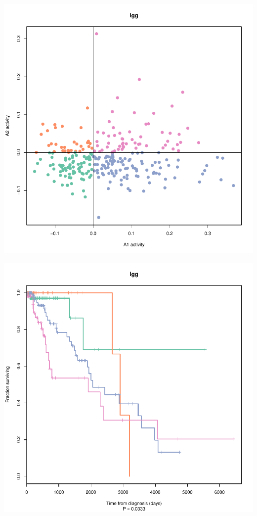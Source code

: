 \documentclass{article}\usepackage[]{graphicx}\usepackage[]{color}
\makeatletter
\def\maxwidth{ %
  \ifdim\Gin@nat@width>\linewidth
    \linewidth
  \else
    \Gin@nat@width
  \fi
}
\newenvironment{knitrout}{}{} %
\makeatother
\begin{document}
\begin{knitrout}
{\centering \includegraphics[width=\maxwidth]{figure/km-curves-11} 

}




{\centering \includegraphics[width=\maxwidth]{figure/km-curves-12} 

}
\end{knitrout}
\end{document}
